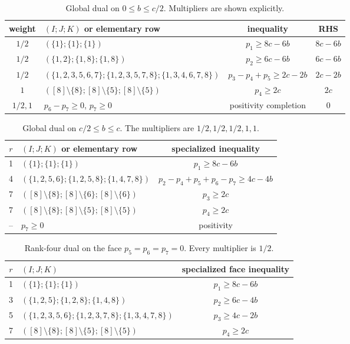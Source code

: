 \documentclass[11pt]{article}
\begin{document}
\begin{table}[H]
\centering
\scriptsize
\caption{Global dual on $0\le b\le c/2$.  Multipliers are shown explicitly.}
\label{tab:lowdual}
\begin{tabular}{@{}c p{6.2cm} c c@{}}
\toprule
weight & $(I;J;K)$ or elementary row & inequality & RHS\\
\midrule
$1/2$ & $(\{1\};\{1\};\{1\})$ & $p_1\ge8c-6b$ & $8c-6b$\\
$1/2$ & $(\{1,2\};\{1,8\};\{1,8\})$ & $p_2\ge6c-6b$ & $6c-6b$\\
$1/2$ & $(\{1,2,3,5,6,7\};\{1,2,3,5,7,8\};\{1,3,4,6,7,8\})$
& $p_3-p_4+p_5\ge2c-2b$ & $2c-2b$\\
$1$ & $([8]\!\setminus\!\{8\};[8]\!\setminus\!\{5\};[8]\!\setminus\!\{5\})$
& $p_4\ge2c$ & $2c$\\
$1/2,1$ & $p_6-p_7\ge0$, $p_7\ge0$ & positivity completion & $0$\\
\bottomrule
\end{tabular}
\end{table}

\begin{table}[H]
\centering
\small
\caption{Global dual on $c/2\le b\le c$.  The multipliers are
$1/2,1/2,1/2,1,1$.}
\label{tab:highdual}
\begin{tabular}{@{}c p{6.1cm} c@{}}
\toprule
$r$ & $(I;J;K)$ or elementary row & specialized inequality\\
\midrule
1 & $(\{1\};\{1\};\{1\})$ & $p_1\ge8c-6b$\\
4 & $(\{1,2,5,6\};\{1,2,5,8\};\{1,4,7,8\})$
& $p_2-p_4+p_5+p_6-p_7\ge4c-4b$\\
7 & $([8]\!\setminus\!\{8\};[8]\!\setminus\!\{6\};[8]\!\setminus\!\{6\})$
& $p_3\ge2c$\\
7 & $([8]\!\setminus\!\{8\};[8]\!\setminus\!\{5\};[8]\!\setminus\!\{5\})$
& $p_4\ge2c$\\
-- & $p_7\ge0$ & positivity\\
\bottomrule
\end{tabular}
\end{table}

\begin{table}[H]
\centering
\small
\caption{Rank-four dual on the face $p_5=p_6=p_7=0$.  Every multiplier is
$1/2$.}
\label{tab:facedual}
\begin{tabular}{@{}c p{6.1cm} c@{}}
\toprule
$r$ & $(I;J;K)$ & specialized face inequality\\
\midrule
1 & $(\{1\};\{1\};\{1\})$ & $p_1\ge8c-6b$\\
3 & $(\{1,2,5\};\{1,2,8\};\{1,4,8\})$ & $p_2\ge6c-4b$\\
5 & $(\{1,2,3,5,6\};\{1,2,3,7,8\};\{1,3,4,7,8\})$ & $p_3\ge4c-2b$\\
7 & $([8]\!\setminus\!\{8\};[8]\!\setminus\!\{5\};[8]\!\setminus\!\{5\})$ & $p_4\ge2c$\\
\bottomrule
\end{tabular}
\end{table}
\end{document}

